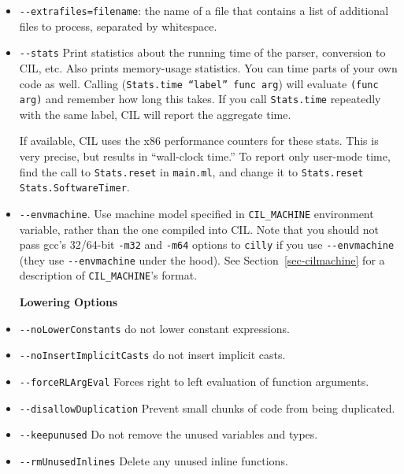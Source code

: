 \documentclass[letterpaper]{article}
\def\secref#1{Section~\ref{sec-#1}}
\def\t#1{{\tt #1}}
\begin{document}
\begin{itemize}
  \item \t{-{}-extrafiles=filename}: the name of a file that contains
    a list of additional files to process, separated by whitespace.
  \item \t{-{}-stats} Print statistics about the running time of the
    parser, conversion to CIL, etc.  Also prints memory-usage
    statistics.  You can time parts of your own code as well.  Calling
    (\t{Stats.time ``label'' func arg}) will evaluate \t{(func arg)}
    and remember how long this takes.  If you call \t{Stats.time}
    repeatedly with the same label, CIL will report the aggregate
    time.

    If available, CIL uses the x86 performance counters for these
    stats.  This is very precise, but results in ``wall-clock time.''
    To report only user-mode time, find the call to \t{Stats.reset} in
    \t{main.ml}, and change it to \t{Stats.reset Stats.SoftwareTimer}.

  \item \t{-{}-envmachine}. Use machine model specified in
    \t{CIL\_MACHINE} environment variable, rather than the one
    compiled into CIL. Note that you should not pass gcc's 32/64-bit
    \t{-m32} and \t{-m64} options to \t{cilly} if you use
    \t{-{}-envmachine} (they use \t{-{}-envmachine} under the hood).
    See \secref{cilmachine} for a description of \t{CIL\_MACHINE}'s
    format.

   {\bf Lowering Options}
  \item \t{-{}-noLowerConstants} do not lower constant expressions.
  \item \t{-{}-noInsertImplicitCasts} do not insert implicit casts.
  \item \t{-{}-forceRLArgEval} Forces right to left evaluation of function arguments.
  \item \t{-{}-disallowDuplication} Prevent small chunks of code from being duplicated.
  \item \t{-{}-keepunused} Do not remove the unused variables and types.
  \item \t{-{}-rmUnusedInlines} Delete any unused inline functions.


\end{itemize}
\end{document}
